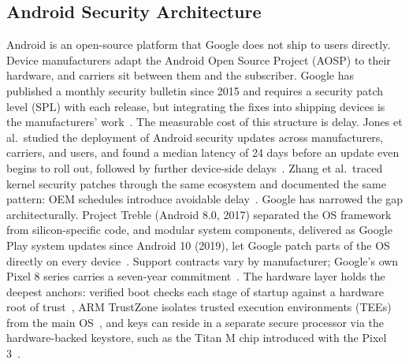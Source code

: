 \documentclass[conference,a4paper]{IEEEtran}
\begin{document}
\subsection{Android Security Architecture}
Android is an open-source platform that Google does not ship to users
directly. Device manufacturers adapt the Android Open Source Project (AOSP)
to their hardware, and carriers sit between them and the subscriber. Google
has published a monthly security bulletin since 2015 and requires a
security patch level (SPL) with each release, but integrating the fixes
into shipping devices is the manufacturers' work~\cite{aospbulletin2026}.
The measurable cost of this structure is delay. Jones et al.\ studied the
deployment of Android security updates across manufacturers, carriers, and
users, and found a median latency of 24 days before an update even begins
to roll out, followed by further device-side delays~\cite{jones2020deploying}.
Zhang et al.\ traced kernel security patches through the same ecosystem and
documented the same pattern: OEM schedules introduce avoidable
delay~\cite{zhang2021kernel}. Google has narrowed the gap architecturally.
Project Treble (Android 8.0, 2017) separated the OS framework from
silicon-specific code, and modular system components, delivered as Google
Play system updates since Android 10 (2019), let Google patch parts of the
OS directly on every device~\cite{mainline2019}. Support contracts vary by
manufacturer; Google's own Pixel 8 series carries a seven-year
commitment~\cite{pixel2023support}. The hardware layer holds the deepest
anchors: verified boot checks each stage of startup against a hardware root
of trust~\cite{aospverifiedboot2026}, ARM TrustZone isolates trusted
execution environments (TEEs) from the main OS~\cite{pinto2019demystifying},
and keys can reside in a separate secure processor via the hardware-backed
keystore, such as the Titan M chip introduced with the Pixel
3~\cite{aospkeystore2026, titanm2018}.
\end{document}
